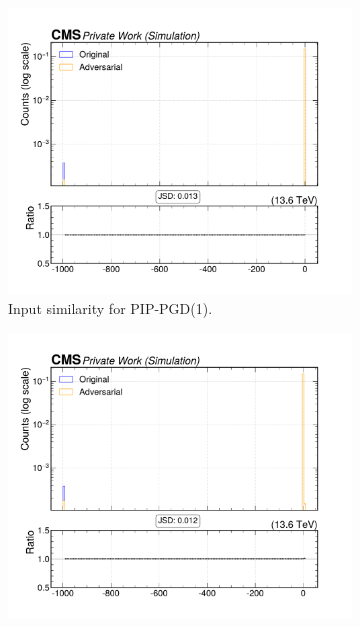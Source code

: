 \begin{figure}[htbp]
  \centering
  \begin{subfigure}[t]{0.32\textwidth}
    \includegraphics[width=\linewidth]{media/output/features/compare/combined_it_1/cmp_global_features_TagVarCSV_trackSumJetEtRatio.pdf}
    \caption*{Input similarity for PIP-PGD(1).}
  \end{subfigure}\hfill
  \begin{subfigure}[t]{0.32\textwidth}
    \includegraphics[width=\linewidth]{media/output/features/compare/combined_it_2/cmp_global_features_TagVarCSV_trackSumJetEtRatio.pdf}

\end{subfigure}
\end{figure}
